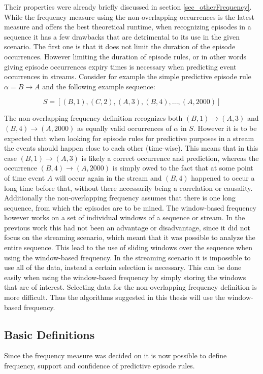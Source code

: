 Their properties were already briefly discussed in section \ref{sec_otherFrequency}. While the frequency measure using the non-overlapping occurrences is the latest measure and offers the best theoretical runtime, when recognizing episodes in a sequence it has a few drawbacks that are detrimental to its use in the given scenario. The first one is that it does not limit the duration of the episode occurrences. However limiting the duration of episode rules, or in other words giving episode occurrences expiry times is necessary when predicting event occurrences in streams. Consider for example the simple predictive episode rule $\alpha = B \rightarrow A$ and the following example sequence: 

\begin{equation}
S = [ (B,1),(C,2),(A,3),(B,4),...,(A,2000) ] 
\end{equation}

The non-overlapping frequency definition recognizes both $(B,1) \rightarrow (A,3)$ and $(B,4) \rightarrow (A,2000)$ as equally valid occurrences of $\alpha$ in $S$. However it is to be expected that when looking for episode rules for predictive purposes in a stream the events should happen close to each other (time-wise). This means that in this case $(B,1) \rightarrow (A,3)$ is likely a correct occurrence and prediction, whereas the occurrence $(B,4) \rightarrow (A,2000)$ is simply owed to the fact that at some point of time event $A$ will occur again in the stream and $(B,4)$ happened to occur a long time before that, without there necessarily being a correlation or causality.
Additionally the non-overlapping frequency assumes that there is one long sequence, from which the episodes are to be mined. The window-based frequency however works on a set of individual windows of a sequence or stream. In the previous work this had not been an advantage or disadvantage, since it did not focus on the streaming scenario, which meant that it was possible to analyze the entire sequence. This lead to the use of sliding windows over the sequence when using the window-based frequency. In the streaming scenario it is impossible to use all of the data, instead a certain selection is necessary. This can be done easily when using the window-based frequency by simply storing the windows that are of interest. Selecting data for the non-overlapping frequency definition is more difficult. Thus the algorithms suggested in this thesis will use the window-based frequency.

\subsection{Basic Definitions}
Since the frequency measure was decided on it is now possible to define frequency, support and confidence of predictive episode rules.

